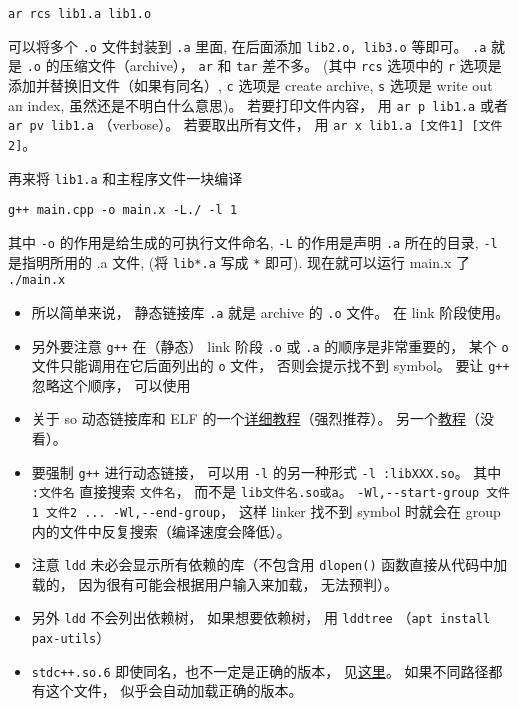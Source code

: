 \begin{lstlisting}[language=none]
ar rcs lib1.a lib1.o
\end{lstlisting}
可以将多个 \verb`.o` 文件封装到 \verb`.a` 里面, 在后面添加 \verb`lib2.o, lib3.o` 等即可。 \verb`.a` 就是 \verb`.o` 的压缩文件（archive）， \verb`ar` 和 \verb`tar` 差不多。 (其中 \verb`rcs` 选项中的 \verb`r` 选项是添加并替换旧文件（如果有同名）, \verb`c` 选项是 create archive, \verb`s` 选项是 write out an index, 虽然还是不明白什么意思)。 若要打印文件内容， 用 \verb`ar p lib1.a` 或者 \verb`ar pv lib1.a` （verbose）。 若要取出所有文件， 用 \verb`ar x lib1.a [文件1] [文件2]`。

再来将 \verb`lib1.a` 和主程序文件一块编译
\begin{lstlisting}[language=none]
g++ main.cpp -o main.x -L./ -l 1
\end{lstlisting}

其中 \verb`-o` 的作用是给生成的可执行文件命名, \verb`-L` 的作用是声明 \verb`.a` 所在的目录, \verb`-l` 是指明所用的 .a 文件, (将 \verb`lib*.a` 写成 \verb`*` 即可).
现在就可以运行 main.x 了
\verb`./main.x`

\begin{itemize}
\item 所以简单来说， 静态链接库 \verb`.a` 就是 archive 的 \verb`.o` 文件。 在 link 阶段使用。
\item 另外要注意 \verb`g++` 在（静态） link 阶段 \verb`.o` 或 \verb`.a` 的顺序是非常重要的， 某个 \verb`o` 文件只能调用在它后面列出的 \verb`o` 文件， 否则会提示找不到 symbol。 要让 \verb`g++` 忽略这个顺序， 可以使用
\item 关于 so 动态链接库和 ELF 的一个\href{https://amir.rachum.com/blog/2016/09/17/shared-libraries/}{详细教程}（强烈推荐）。 另一个\href{https://holtstrom.com/michael/blog/post/446/Shared-Library-Symbol-Conflicts-(on-Solaris).html}{教程}（没看）。
\item 要强制 \verb`g++` 进行动态链接， 可以用 \verb`-l` 的另一种形式 \verb`-l :libXXX.so`。 其中 \verb`:文件名` 直接搜索 \verb`文件名`， 而不是 \verb`lib文件名.so或a`。
\verb`-Wl,--start-group 文件1 文件2 ... -Wl,--end-group`， 这样 linker 找不到 symbol 时就会在 group 内的文件中反复搜索（编译速度会降低）。
\item 注意 \verb`ldd` 未必会显示所有依赖的库（不包含用 \verb`dlopen()` 函数直接从代码中加载的， 因为很有可能会根据用户输入来加载， 无法预判）。
\item 另外 \verb`ldd` 不会列出依赖树， 如果想要依赖树， 用 \verb`lddtree` （\verb`apt install pax-utils`）
\item \verb`stdc++.so.6` 即使同名，也不一定是正确的版本， 见\href{https://unix.stackexchange.com/questions/458659/what-do-the-multiple-glibc-versions-mean-in-the-output-of-ldd}{这里}。 如果不同路径都有这个文件， 似乎会自动加载正确的版本。
\end{itemize}

